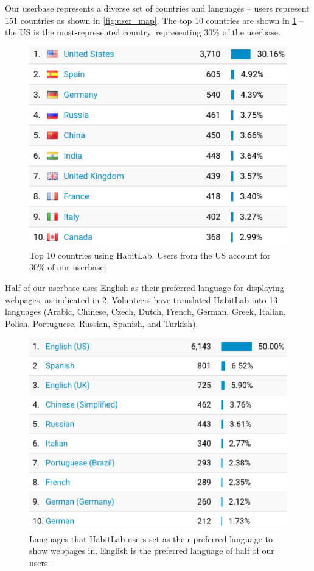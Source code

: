 Our userbase represents a diverse set of countries and languages -- users represent 151 countries as shown in \ref{fig:user_map}. The top 10 countries are shown in \ref{fig:user_countries} -- the US is the most-represented country, representing 30\% of the userbase.

\begin{figure}
	\includegraphics[width=1.0\textwidth]{figuresS/user_countries.png}
	\caption{Top 10 countries using HabitLab. Users from the US account for 30\% of our userbase.}
\label{fig:user_countries}
\end{figure}

Half of our userbase uses English as their preferred language for displaying webpages, as indicated in \ref{fig:user_languages}. Volunteers have translated HabitLab into 13 languages (Arabic, Chinese, Czech, Dutch, French, German, Greek, Italian, Polish, Portuguese, Russian, Spanish, and Turkish).

\begin{figure}
	\includegraphics[width=1.0\textwidth]{figuresS/user_languages.png}
	\caption{Languages that HabitLab users set as their preferred language to show webpages in. English is the preferred language of half of our users.}
\label{fig:user_languages}
\end{figure}

